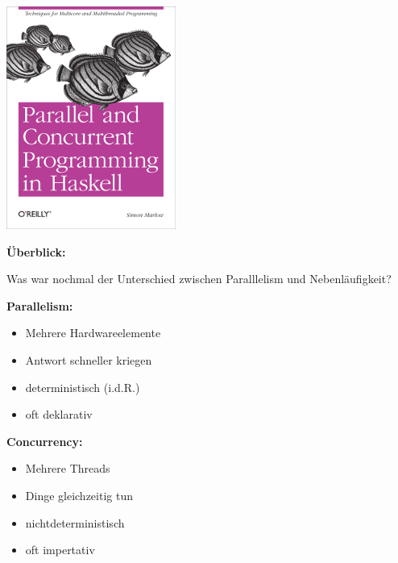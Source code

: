 \documentclass{beamer}
\begin{document}

\begin{frame}

\begin{center}
\includegraphics[scale=1]{../Woche6/parcur.png} 
\end{center}

\end{frame}


\begin{frame}

\textbf{Überblick:}
\pause

Was war nochmal der Unterschied zwischen Paralllelism und Nebenläufigkeit?

\begin{multicols}{2}
\textbf{Parallelism:}
\begin{itemize}
\item Mehrere Hardwareelemente\pause
\item Antwort schneller kriegen\pause
\item deterministisch (i.d.R.)\pause
\item oft deklarativ\pause
\end{itemize}
\columnbreak
\textbf{Concurrency:}
\begin{itemize}
\item Mehrere Threads\pause
\item Dinge gleichzeitig tun\pause
\item nichtdeterministisch\pause
\item oft impertativ
\end{itemize}
\end{multicols}

\end{frame}
\end{document}

